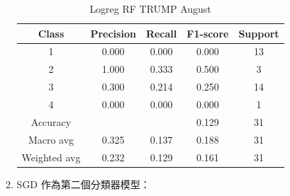 \begin{enumerate}
\begin{enumerate}
\begin{table}[H]
            \vspace{1em}
            
            \scriptsize
            \begin{tabular}{c|cccc}
            \hline
            Class & Precision & Recall & F1-score & Support \\
            \hline
            1 & 0.000 & 0.000 & 0.000 & 13 \\
            2 & 1.000 & 0.333 & 0.500 & 3 \\
            3 & 0.300 & 0.214 & 0.250 & 14 \\
            4 & 0.000 & 0.000 & 0.000 & 1 \\
            \hline
            Accuracy &       &      & 0.129 & 31 \\
            Macro avg & 0.325 & 0.137 & 0.188 & 31 \\
            Weighted avg & 0.232 & 0.129 & 0.161 & 31 \\
            \hline
            \end{tabular}
            \caption{Logreg RF TRUMP August}
            \label{tab:classifier_2_report_logreg_rf_trump_filtered_aug}
            \end{table}

            \pagebreak

            \item SGD 作為第二個分類器模型：


\end{enumerate}
\end{enumerate}
